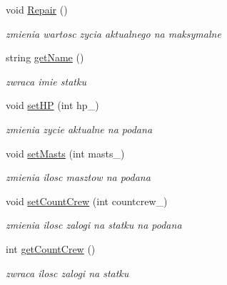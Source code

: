 \begin{DoxyCompactItemize}
\mbox{\label{class_ship_a1046a0f2b87a03252ffc13582880cc11}} 
void \hyperlink{class_ship_a1046a0f2b87a03252ffc13582880cc11}{Repair} ()
\begin{DoxyCompactList}\small\item\em zmienia wartosc zycia aktualnego na maksymalne \end{DoxyCompactList}\item 
\mbox{\label{class_ship_a70faa1b6274d9b9303d263e51071b29a}} 
string \hyperlink{class_ship_a70faa1b6274d9b9303d263e51071b29a}{get\+Name} ()
\begin{DoxyCompactList}\small\item\em zwraca imie statku \end{DoxyCompactList}\item 
\mbox{\label{class_ship_a53ac9d01792ca3cdbc7c35e38240867a}} 
void \hyperlink{class_ship_a53ac9d01792ca3cdbc7c35e38240867a}{set\+HP} (int hp\+\_\+)
\begin{DoxyCompactList}\small\item\em zmienia zycie aktualne na podana \end{DoxyCompactList}\item 
\mbox{\label{class_ship_a740a100b66b4f2ee628994c0c16da24b}} 
void \hyperlink{class_ship_a740a100b66b4f2ee628994c0c16da24b}{set\+Masts} (int masts\+\_\+)
\begin{DoxyCompactList}\small\item\em zmienia ilosc masztow na podana \end{DoxyCompactList}\item 
\mbox{\label{class_ship_a3b79ef24977758ea65b543dd30a7b008}} 
void \hyperlink{class_ship_a3b79ef24977758ea65b543dd30a7b008}{set\+Count\+Crew} (int countcrew\+\_\+)
\begin{DoxyCompactList}\small\item\em zmienia ilosc zalogi na statku na podana \end{DoxyCompactList}\item 
\mbox{\label{class_ship_a1da55c7ad0c972527a122e0bccc07fcd}} 
int \hyperlink{class_ship_a1da55c7ad0c972527a122e0bccc07fcd}{get\+Count\+Crew} ()
\begin{DoxyCompactList}\small\item\em zwraca ilosc zalogi na statku \end{DoxyCompactList}\item 

\end{DoxyCompactItemize}
